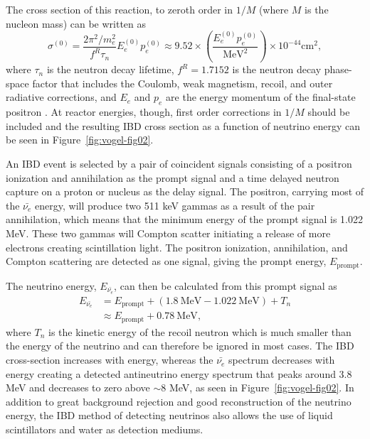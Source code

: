 The cross section of this reaction, to zeroth order in $1/M$ (where $M$ is the nucleon mass) can be written as
\begin{equation}
\sigma^{(0)} = \frac{2\pi^2/m_e^2}{{f^R}\tau_n}E_e^{(0)}p_e^{(0)} \approx 9.52 \times \left(\frac{E_e^{(0)}p_e^{(0)}}{\textrm{MeV}^2}\right) \times 10^{-44}\textrm{cm}^2,
\end{equation}
where $\tau_n$ is the neutron decay lifetime, $f^R = 1.7152$ is the neutron decay phase-space factor that includes the Coulomb, weak magnetism, recoil, and outer radiative corrections, and $E_e$ and $p_e$ are the energy momentum of the final-state positron \cite{HayesVogel}.
At reactor energies, though, first order corrections in $1/M$ should be included \cite{Vogel:1999zy} and the resulting IBD cross section as a function of neutrino energy can be seen in Figure~\ref{fig:vogel-fig02}.


An IBD event is selected by a pair of coincident signals consisting of a positron ionization and annihilation as the prompt signal and a time delayed neutron capture on a proton or nucleus as the delay signal. 
The positron, carrying most of the $\bar{\nu_{e}}$ energy, will produce two 511 keV gammas as a result of the pair annihilation, which means that the minimum energy of the prompt signal is 1.022 MeV.
These two gammas will Compton scatter initiating a release of more electrons creating scintillation light.
The positron ionization, annihilation, and Compton scattering are detected as one signal, giving the prompt energy, $E_{\textrm{prompt}}$.

The neutrino energy, $E_{\bar{\nu_{e}}}$, can then be calculated from this prompt signal as 
\begin{equation}
\begin{split}
	E_{\bar{\nu_{e}}} &= E_{\textrm{prompt}} + (1.8~\textrm{MeV} - 1.022~\textrm{MeV}) + T_n \\
			&\approx E_{\textrm{prompt}} + 0.78~\textrm{MeV},
\end{split}
\end{equation}
where $T_n$ is the kinetic energy of the recoil neutron which is much smaller than the energy of the neutrino and can therefore be ignored in most cases. 
The IBD cross-section increases with energy, whereas the $\bar{\nu_{e}}$ spectrum decreases with energy creating a detected antineutrino energy spectrum that peaks around 3.8 MeV and decreases to zero above $\sim$8 MeV, as seen in Figure~\ref{fig:vogel-fig02}. 
In addition to great background rejection and good reconstruction of the neutrino energy, the IBD method of detecting neutrinos also allows the use of liquid scintillators and water as detection mediums. 

